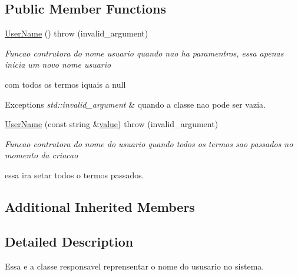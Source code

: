 \subsection*{Public Member Functions}
\begin{DoxyCompactItemize}
\item 
\hypertarget{class_user_name_a626847c55a66153050e35c6ffb798295}{\hyperlink{class_user_name_a626847c55a66153050e35c6ffb798295}{User\-Name} ()  throw (invalid\-\_\-argument)}\label{class_user_name_a626847c55a66153050e35c6ffb798295}

\begin{DoxyCompactList}\small\item\em Funcao contrutora do nome usuario quando nao ha paramentros, essa apenas inicia um novo nome usuario \par
 com todos os termos iquais a null 
\begin{DoxyExceptions}{Exceptions}
{\em std\-::invalid\-\_\-argument} & quando a classe nao pode ser vazia. \\
\hline
\end{DoxyExceptions}
\end{DoxyCompactList}\item 
\hyperlink{class_user_name_a1ca90dd851bb23f861fb38fc59c8f196}{User\-Name} (const string \&\hyperlink{class_basic_type_af9b2c5cc32647df01083a6802e913dbf}{value})  throw (invalid\-\_\-argument)
\begin{DoxyCompactList}\small\item\em Funcao contrutora do nome do usuario quando todos os termos sao passados no momento da criacao \par
 essa ira setar todos o termos passados. \end{DoxyCompactList}\end{DoxyCompactItemize}
\subsection*{Additional Inherited Members}


\subsection{Detailed Description}
Essa e a classe responsavel reprensentar o nome do ususario no sistema. 

